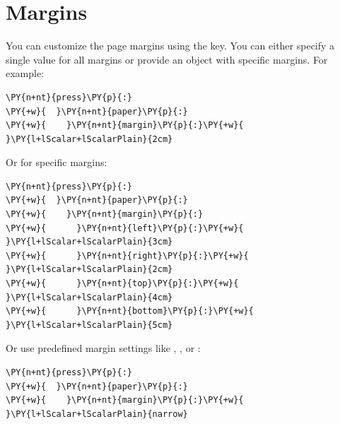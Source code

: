 \documentclass[a4paper,twoside]{article}
\begin{document}
\section{Margins}
You can customize the page margins using the  key. You can either specify a single value for all margins or provide an object with specific margins. For example:
\begin{tscode}[lang=yaml, engine=pygments]
\begin{Verbatim}[commandchars=\\\{\},breaklines, breakanywhere, commandchars=\\\{\}]
\PY{n+nt}{press}\PY{p}{:}
\PY{+w}{  }\PY{n+nt}{paper}\PY{p}{:}
\PY{+w}{    }\PY{n+nt}{margin}\PY{p}{:}\PY{+w}{ }\PY{l+lScalar+lScalarPlain}{2cm}
\end{Verbatim}
\end{tscode}
Or for specific margins:
\begin{tscode}[lang=yaml, engine=pygments]
\begin{Verbatim}[commandchars=\\\{\},breaklines, breakanywhere, commandchars=\\\{\}]
\PY{n+nt}{press}\PY{p}{:}
\PY{+w}{  }\PY{n+nt}{paper}\PY{p}{:}
\PY{+w}{    }\PY{n+nt}{margin}\PY{p}{:}
\PY{+w}{      }\PY{n+nt}{left}\PY{p}{:}\PY{+w}{ }\PY{l+lScalar+lScalarPlain}{3cm}
\PY{+w}{      }\PY{n+nt}{right}\PY{p}{:}\PY{+w}{ }\PY{l+lScalar+lScalarPlain}{2cm}
\PY{+w}{      }\PY{n+nt}{top}\PY{p}{:}\PY{+w}{ }\PY{l+lScalar+lScalarPlain}{4cm}
\PY{+w}{      }\PY{n+nt}{bottom}\PY{p}{:}\PY{+w}{ }\PY{l+lScalar+lScalarPlain}{5cm}
\end{Verbatim}
\end{tscode}
Or use predefined margin settings like , , or :
\begin{tscode}[lang=yaml, engine=pygments]
\begin{Verbatim}[commandchars=\\\{\},breaklines, breakanywhere, commandchars=\\\{\}]
\PY{n+nt}{press}\PY{p}{:}
\PY{+w}{  }\PY{n+nt}{paper}\PY{p}{:}
\PY{+w}{    }\PY{n+nt}{margin}\PY{p}{:}\PY{+w}{ }\PY{l+lScalar+lScalarPlain}{narrow}
\end{Verbatim}
\end{tscode}
\end{document}
